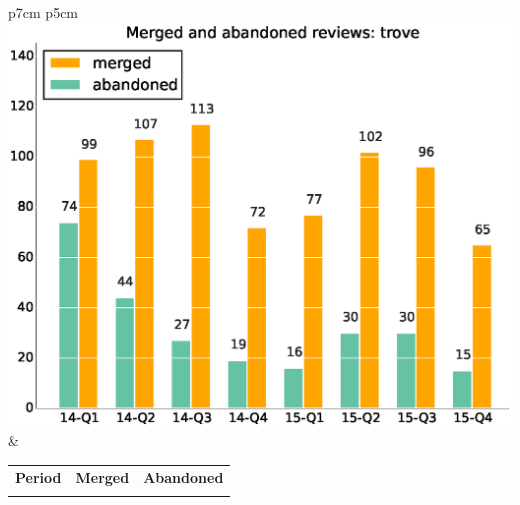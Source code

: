 \documentclass[a4wide,11pt]{article}
\begin{document}
\begin{tabular}{p{7cm} p{5cm}}
    \vspace{0pt} 
    \includegraphics[scale=.35]{figs/submitted_reviewstrove.eps}
    & 
    \vspace{0pt}
    \begin{tabular}{l|r|r|}%
    \bfseries Period & \bfseries Merged & \bfseries Abandoned %
    \csvreader[head to column names]{data/submitted_reviewstrove.csv}{}%
    {\\ & \merged & \abandoned}
    \end{tabular}
\end{tabular}


\end{document}
